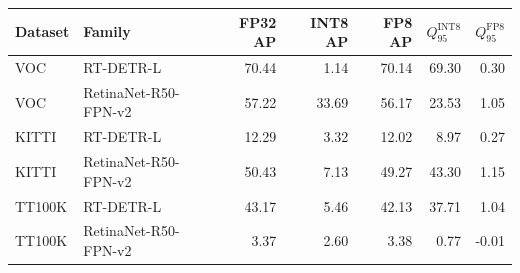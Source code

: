 \begin{tabular}{llrrrrr}
\toprule
Dataset & Family & FP32 AP & INT8 AP & FP8 AP & $Q_{95}^{\mathrm{INT8}}$ & $Q_{95}^{\mathrm{FP8}}$ \\
\midrule
VOC & RT-DETR-L & 70.44 & 1.14 & 70.14 & 69.30 & 0.30 \\
VOC & RetinaNet-R50-FPN-v2 & 57.22 & 33.69 & 56.17 & 23.53 & 1.05 \\
KITTI & RT-DETR-L & 12.29 & 3.32 & 12.02 & 8.97 & 0.27 \\
KITTI & RetinaNet-R50-FPN-v2 & 50.43 & 7.13 & 49.27 & 43.30 & 1.15 \\
TT100K & RT-DETR-L & 43.17 & 5.46 & 42.13 & 37.71 & 1.04 \\
TT100K & RetinaNet-R50-FPN-v2 & 3.37 & 2.60 & 3.38 & 0.77 & -0.01 \\
\bottomrule
\end{tabular}